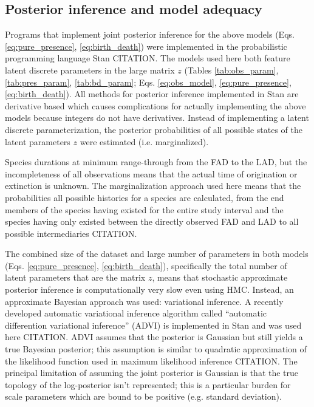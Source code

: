 \documentclass[12pt,letterpaper]{article}
\begin{document}
\subsection*{Posterior inference and model adequacy}
Programs that implement joint posterior inference for the above models (Eqs. \ref{eq:pure_presence}, \ref{eq:birth_death}) were implemented in the probabilistic programming language Stan CITATION. The models used here both feature latent discrete parameters in the large matrix \(z\) (Tables \ref{tab:obs_param}, \ref{tab:pres_param}, \ref{tab:bd_param}; Eqs. \ref{eq:obs_model}, \ref{eq:pure_presence}, \ref{eq:birth_death}). All methods for posterior inference implemented in Stan are derivative based which causes complications for actually implementing the above models because integers do not have derivatives. Instead of implementing a latent discrete parameterization, the posterior probabilities of all possible states of the latent parameters \(z\) were estimated (i.e. marginalized). 

Species durations at minimum range-through from the FAD to the LAD, but the incompleteness of all observations means that the actual time of origination or extinction is unknown. The marginalization approach used here means that the probabilities all possible histories for a species are calculated, from the end members of the species having existed for the entire study interval and the species having only existed between the directly observed FAD and LAD to all possible intermediaries CITATION. %



The combined size of the dataset and large number of parameters in both models (Eqs. \ref{eq:pure_presence}, \ref{eq:birth_death}), specifically the total number of latent parameters that are the matrix \(z\), means that stochastic approximate posterior inference is computationally very slow even using HMC. Instead, an approximate Bayesian approach was used: variational inference. A recently developed automatic variational inference algorithm called ``automatic differention variational inference'' (ADVI) is implemented in Stan and was used here CITATION. ADVI assumes that the posterior is Gaussian but still yields a true Bayesian posterior; this assumption is similar to quadratic approximation of the likelihood function used in maximum likelihood inference CITATION. The principal limitation of assuming the joint posterior is Gaussian is that the true topology of the log-posterior isn't represented; this is a particular burden for scale parameters which are bound to be positive (e.g. standard deviation).
\end{document}
